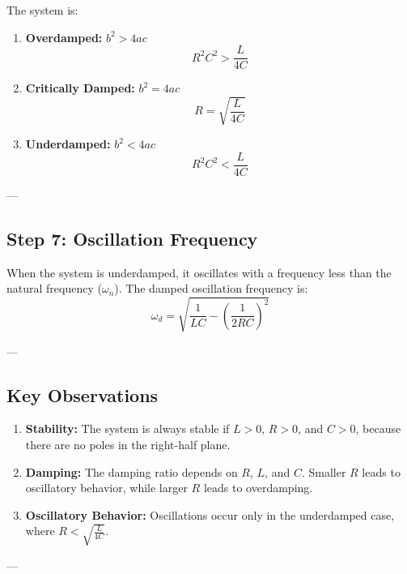 \documentclass[12pt]{article}
\begin{document}
The system is:
\begin{enumerate}
    \item \textbf{Overdamped:} \(b^2 > 4ac\)
    \[
    R^2C^2 > \frac{L}{4C}
    \]

    \item \textbf{Critically Damped:} \(b^2 = 4ac\)
    \[
    R = \sqrt{\frac{L}{4C}}
    \]

    \item \textbf{Underdamped:} \(b^2 < 4ac\)
    \[
    R^2C^2 < \frac{L}{4C}
    \]
\end{enumerate}

---

\subsection*{Step 7: Oscillation Frequency}

When the system is underdamped, it oscillates with a frequency less than the natural frequency (\(\omega_n\)). The damped oscillation frequency is:
\[
\omega_d = \sqrt{\frac{1}{LC} - \left(\frac{1}{2RC}\right)^2} \tag{4}
\]

---

\subsection*{Key Observations}

\begin{enumerate}
    \item \textbf{Stability:}
    The system is always stable if \(L > 0\), \(R > 0\), and \(C > 0\), because there are no poles in the right-half plane.

    \item \textbf{Damping:}
    The damping ratio depends on \(R\), \(L\), and \(C\). Smaller \(R\) leads to oscillatory behavior, while larger \(R\) leads to overdamping.

    \item \textbf{Oscillatory Behavior:}
    Oscillations occur only in the underdamped case, where \(R < \sqrt{\frac{L}{4C}}\).
\end{enumerate}

---
\end{document}
